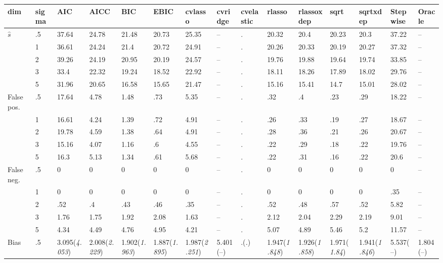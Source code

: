 \documentclass{article}
\begin{document}
\begin{table}[tbp] \centering
{}

{\tiny
\begin{tabularx}{\textwidth}{lCCCCCCCCCCCCCC}

\toprule
{dim}&{sigma}&{AIC}&{AICC}&{BIC}&{EBIC}&{cvlasso}&{cvridge}&{cvelastic}&{rlasso}&{rlassoxdep}&{sqrt}&{sqrtxdep}&{Stepwise}&{Oracle} \tabularnewline
\midrule\addlinespace[1.5ex]
$\hat{s}$&.5&37.64&24.78&21.48&20.73&25.35&--&.&20.32&20.4&20.23&20.3&37.22&-- \tabularnewline
&1&36.61&24.24&21.4&20.72&24.91&--&.&20.26&20.33&20.19&20.27&37.32&-- \tabularnewline
&2&39.26&24.19&20.95&20.19&24.57&--&.&19.76&19.88&19.64&19.74&33.85&-- \tabularnewline
&3&33.4&22.32&19.24&18.52&22.92&--&.&18.11&18.26&17.89&18.02&29.76&-- \tabularnewline
&5&31.96&20.65&16.58&15.65&21.47&--&.&15.16&15.41&14.7&15.01&28.02&-- \tabularnewline
\midrule False pos.&.5&17.64&4.78&1.48&.73&5.35&--&.&.32&.4&.23&.29&18.22&-- \tabularnewline
&1&16.61&4.24&1.39&.72&4.91&--&.&.26&.33&.19&.27&18.67&-- \tabularnewline
&2&19.78&4.59&1.38&.64&4.91&--&.&.28&.36&.21&.26&20.67&-- \tabularnewline
&3&15.16&4.07&1.16&.6&4.55&--&.&.22&.29&.18&.22&19.76&-- \tabularnewline
&5&16.3&5.13&1.34&.61&5.68&--&.&.22&.31&.16&.22&20.6&-- \tabularnewline
\midrule False neg.&.5&0&0&0&0&0&--&.&0&0&0&0&0&-- \tabularnewline
&1&0&0&0&0&0&--&.&0&0&0&0&.35&-- \tabularnewline
&2&.52&.4&.43&.46&.35&--&.&.52&.48&.57&.52&5.82&-- \tabularnewline
&3&1.76&1.75&1.92&2.08&1.63&--&.&2.12&2.04&2.29&2.19&9.01&-- \tabularnewline
&5&4.34&4.49&4.76&4.95&4.21&--&.&5.07&4.89&5.46&5.2&11.57&-- \tabularnewline
\midrule Bias&.5&3.095\newline (\emph{4.053})&2.008\newline (\emph{2.229})&1.902\newline (\emph{1.963})&1.887\newline (\emph{1.895})&1.987\newline (\emph{2.251})&5.401\newline (--)&.\newline (\emph{.})&1.947\newline (\emph{1.848})&1.926\newline (\emph{1.858})&1.971\newline (\emph{1.84})&1.941\newline (\emph{1.846})&5.537\newline (--)&1.804\newline (--) \tabularnewline

\end{tabularx}}
\end{table}
\end{document}

